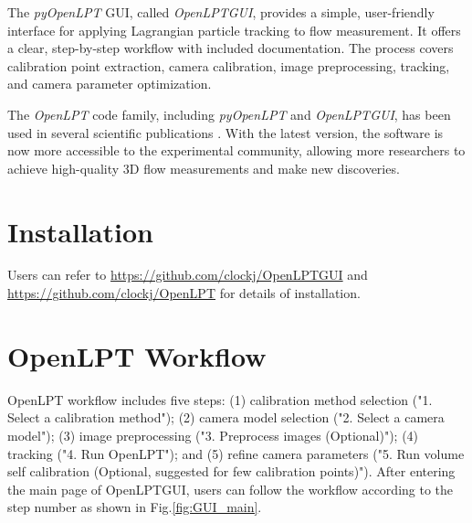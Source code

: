 \documentclass[a4paper,fleqn]{article}
\begin{document}
The \textit{pyOpenLPT} GUI, called \textit{OpenLPTGUI}, provides a simple, user-friendly interface for applying Lagrangian particle tracking to flow measurement. It offers a clear, step-by-step workflow with included documentation. The process covers calibration point extraction, camera calibration, image preprocessing, tracking, and camera parameter optimization.


The \textit{OpenLPT} code family, including \textit{pyOpenLPT} and \textit{OpenLPTGUI}, has been used in several scientific publications \citep{salibindla2020lift,qi2020towards,masuk2021simultaneous,salibindla2021experimental,masuk2021orientational,masuk2021towards,qi2022fragmentation,tan2022universality,tan2023scalings}. With the latest version, the software is now more accessible to the experimental community, allowing more researchers to achieve high-quality 3D flow measurements and make new discoveries.



\section{Installation}

Users can refer to \url{https://github.com/clockj/OpenLPTGUI} and \url{https://github.com/clockj/OpenLPT} for details of installation.


\section{OpenLPT Workflow}

OpenLPT workflow includes five steps: (1) calibration method selection ("1. Select a calibration method"); (2) camera model selection ("2. Select a camera model"); (3) image preprocessing ("3. Preprocess images (Optional)"); (4) tracking ("4. Run OpenLPT"); and (5) refine camera parameters ("5. Run volume self calibration (Optional, suggested for few calibration points)"). 
After entering the main page of OpenLPTGUI, users can follow the workflow according to the step number as shown in Fig.\ref{fig:GUI_main}. 
\end{document}

